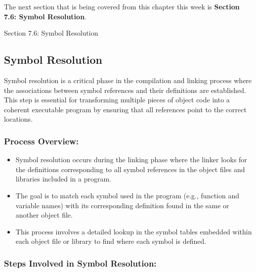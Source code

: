 The next section that is being covered from this chapter this week is \textbf{Section 7.6: Symbol Resolution}.

\begin{notes}{Section 7.6: Symbol Resolution}
    \subsection*{Symbol Resolution}

    Symbol resolution is a critical phase in the compilation and linking process where the associations between symbol references and their definitions are established. This step is essential for 
    transforming multiple pieces of object code into a coherent executable program by ensuring that all references point to the correct locations. \vspace*{1em}
    
    \subsubsection*{Process Overview:}
    
    \begin{itemize}
        \item Symbol resolution occurs during the linking phase where the linker looks for the definitions corresponding to all symbol references in the object files and libraries included in a program.
        \item The goal is to match each symbol used in the program (e.g., function and variable names) with its corresponding definition found in the same or another object file.
        \item This process involves a detailed lookup in the symbol tables embedded within each object file or library to find where each symbol is defined.
    \end{itemize}
    
    \subsubsection*{Steps Involved in Symbol Resolution:}
    

\end{notes}
